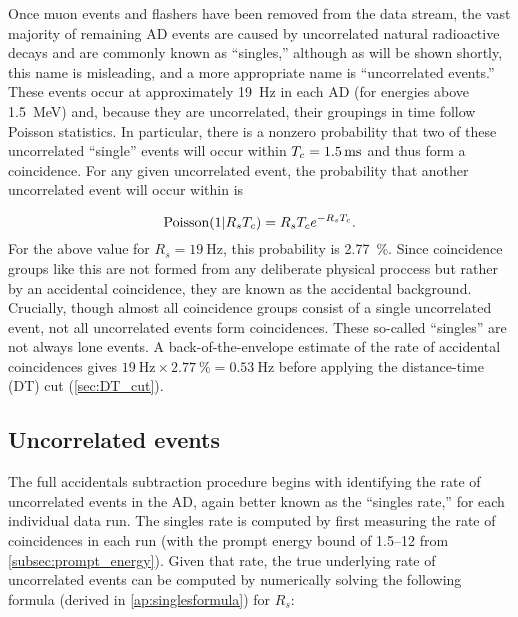 Once muon events and flashers have been removed from the data stream,
the vast majority of remaining AD events are caused by uncorrelated
natural radioactive decays and are commonly known as ``singles,''
although as will be shown shortly, this name is misleading,
and a more appropriate name is ``uncorrelated events.''
These events occur at approximately \SI{19}{\hertz} in each AD
(for energies above \SI{1.5}{\MeV})
and,
because they are uncorrelated, their groupings in time follow Poisson statistics.
In particular, there is a nonzero probability that
two of these uncorrelated ``single'' events will occur within
$T_c=\SI{1.5}{\milli\second}$ and thus form a  coincidence.
For any given uncorrelated event, the probability that
another uncorrelated event will occur within \tc{} is

\begin{equation}
    \text{Poisson}(1\vert R_sT_c) = R_sT_c e^{-R_sT_c}.
\end{equation}
For the above value for $R_s=\SI{19}{\hertz}$, this probability is \SI{2.77}{\percent}.
Since  coincidence groups like this are not formed from any
deliberate physical proccess but rather by an accidental coincidence,
they are known as the accidental background.
Crucially, though almost all  coincidence groups
consist of a single uncorrelated event,
not all uncorrelated events form  coincidences.
These so-called ``singles'' are not always lone events.
A back-of-the-envelope estimate of the rate of accidental coincidences gives
$\SI{19}{\hertz}\times\SI{2.77}{\percent}=\SI{0.53}{\hertz}$
before applying the distance-time (DT) cut (\cref{sec:DT_cut}).

\subsection{Uncorrelated events}
\label{subsec:singles}

The full accidentals subtraction procedure begins with identifying
the rate of uncorrelated events in the AD, again better known
as the ``singles rate,'' for each individual data run.
The singles rate is computed by first measuring the rate of
 coincidences in each run
(with the prompt energy bound of \SIrange{1.5}{12}{\mev} from \cref{subsec:prompt_energy}).
Given that rate, the true underlying rate of uncorrelated events can be
computed by numerically solving the following formula
(derived in \cref{ap:singlesformula}) for $R_s$:

